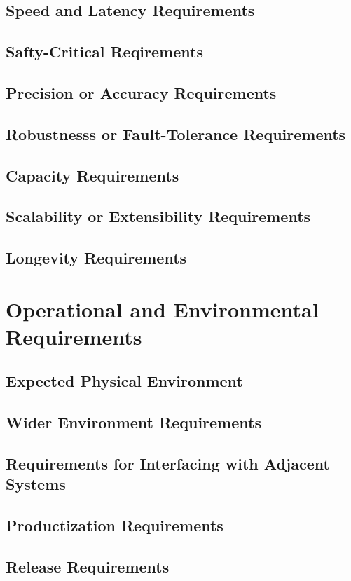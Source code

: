 \documentclass[]{article}
\begin{document}
\subsection{Speed and Latency Requirements}
\subsection{Safty-Critical Reqirements}
\subsection{Precision or Accuracy Requirements}
\subsection{Robustnesss or Fault-Tolerance Requirements}
\subsection{Capacity Requirements}
\subsection{Scalability or Extensibility Requirements}
\subsection{Longevity Requirements}

\section{Operational and Environmental Requirements}
\subsection{Expected Physical Environment}
\subsection{Wider Environment Requirements}
\subsection{Requirements for Interfacing with Adjacent Systems}
\subsection{Productization Requirements}
\subsection{Release Requirements}
\end{document}
